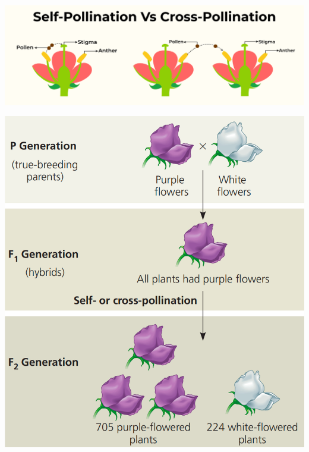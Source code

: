 \documentclass[
]{book}
\begin{document}
\includegraphics{./img/l9-1.png}

\includegraphics{./img/l9-2.png}

  
\end{document}
